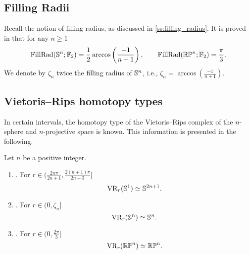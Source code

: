 \subsection{Filling Radii}

Recall the notion of filling radius, as discussed in \cref{ss:filling_radius}.
It is proved in \cite{katz1983filling} that for any $n \geq 1$
\[
\operatorname{FillRad}(\mathbb{S}^n;{\mathbb{F}_2}) = \frac{1}{2}\arccos\left(\frac{-1}{n+1}\right), \qquad
\operatorname{FillRad}(\mathbb{RP}^n;{\mathbb{F}_2}) = \frac{\pi}{3}.
\]
We denote by $\zeta_n$ twice the filling radius of $\mathbb{S}^n$, i.e., $\zeta_n = \arccos(\frac{-1}{n+1})$.

\subsection{Vietoris--Rips homotopy types}\label{prop:homotopy type}

In certain intervals, the homotopy type of the Vietoris--Rips complex of the $n$-sphere and $n$-projective space is known.
This information is presented in the following.

\medskip\proposition Let $n$ be a positive integer.
\begin{enumerate}[{\rm (a)}]
	\item\label{prop:S1}{\rm \cite[Thm.~7.4]{adamaszek2017vietoris}.}
	For $r \in (\frac{2n\pi}{2n+1}, \frac{2(n+1)\pi}{2n+3}]$
	\[
	\operatorname{VR}_r(\mathbb{S}^1) \simeq \mathbb{S}^{2n+1}.
	\]
	
	\item\label{prop:Sn}{\rm \cite[Thm.~10]{lim2020vietoris}.}
	For $r \in (0, \zeta_n]$
	\[
	\operatorname{VR}_r(\mathbb{S}^n) \simeq \mathbb{S}^n.
	\]
	
	\item\label{prop:RPn}{\rm \cite[Thm.~4.5]{adams2022metric}.}
	For $r \in (0,\frac{2\pi}{3} ]$
	\[
	\operatorname{VR}_r(\mathbb{RP}^n) \simeq \mathbb{RP}^n.
	\]
\end{enumerate}